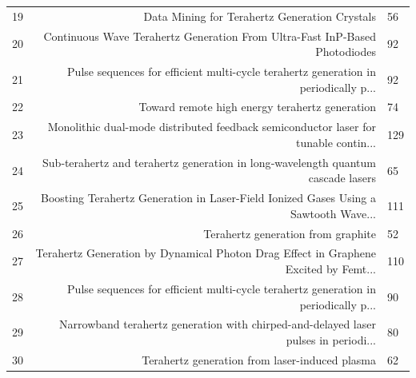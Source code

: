 \documentclass[reprint,amsmath,amssymb,aps,floatfix]{revtex4-2}
\begin{document}
\begin{table}[h!]
\begin{tabular}{@{ }p{10cm}r@{ }}
19 & Data Mining for Terahertz Generation Crystals & 56\\
20 & Continuous Wave Terahertz Generation From Ultra-Fast InP-Based Photodiodes & 92\\
21 & Pulse sequences for efficient multi-cycle terahertz generation in periodically p... & 92\\
22 & Toward remote high energy terahertz generation & 74\\
23 & Monolithic dual-mode distributed feedback semiconductor laser for tunable contin... & 129\\
24 & Sub‐terahertz and terahertz generation in long‐wavelength quantum cascade lasers & 65\\
25 & Boosting Terahertz Generation in Laser-Field Ionized Gases Using a Sawtooth Wave... & 111\\
26 & Terahertz generation from graphite & 52\\
27 & Terahertz Generation by Dynamical Photon Drag Effect in Graphene Excited by Femt... & 110\\
28 & Pulse sequences for efficient multi-cycle terahertz generation in periodically p... & 90\\
29 & Narrowband terahertz generation with chirped-and-delayed laser pulses in periodi... & 80\\
30 & Terahertz generation from laser-induced plasma & 62\\
\hline
\end{tabular}
\end{table}
\end{document}
